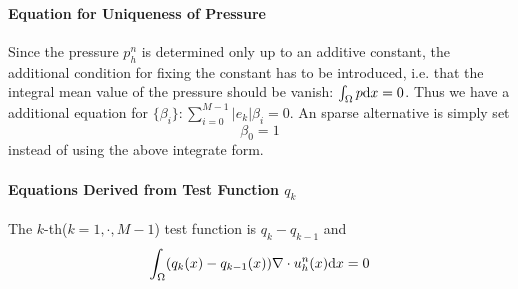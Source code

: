 \paragraph{Equation for Uniqueness of Pressure} Since the pressure $p_h^n$ is determined only up to an additive constant, 
the additional condition for fixing the constant has to be introduced, 
i.e. that the integral mean value of the pressure should be vanish: $\int_\Omega p\mathrm{d} x=0$. Thus we have a additional equation for 
$\{\beta_i\}: \sum_{i=0}^{M-1}|e_k|\beta_i=0$.
An sparse alternative is simply set 
\[\beta_0=1\] 
instead of using the above integrate form.

\paragraph{Equations Derived from Test Function $q_k$} 
The $k$-th($k=1,\cdot,M-1$) test function is $q_k-q_{k-1}$ and 
\begin{equation}\label{eq:equation-testq}
  \int_{\Omega}(q_k(x)-q_{k-1}(x))\nabla\cdot u_h^n(x)\mathrm{d} x=0
\end{equation}

